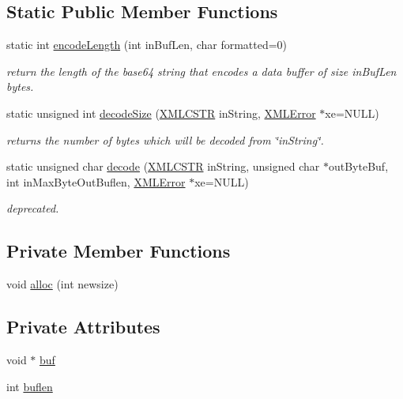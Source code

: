 \subsection*{Static Public Member Functions}
\begin{DoxyCompactItemize}
\item 
static int \hyperlink{structXMLParserBase64Tool_a5fe50fd66dc68efe6f3d39b5eb67fe8d}{encode\-Length} (int in\-Buf\-Len, char formatted=0)
\begin{DoxyCompactList}\small\item\em return the length of the base64 string that encodes a data buffer of size in\-Buf\-Len bytes. \end{DoxyCompactList}\item 
static unsigned int \hyperlink{structXMLParserBase64Tool_adce9ee3c0bc1cae2ab2b511add3ea91e}{decode\-Size} (\hyperlink{xmlParser_8h_acdb0d6fd8dd596384b438d86cfb2b182}{X\-M\-L\-C\-S\-T\-R} in\-String, \hyperlink{xmlParser_8h_ac39bd07b1461aaa70afffe2d7162b4f5}{X\-M\-L\-Error} $\ast$xe=N\-U\-L\-L)
\begin{DoxyCompactList}\small\item\em returns the number of bytes which will be decoded from \char`\"{}in\-String\char`\"{}. \end{DoxyCompactList}\item 
static unsigned char \hyperlink{structXMLParserBase64Tool_af76fe76cb08f0a3fca6d7352c0dcb218}{decode} (\hyperlink{xmlParser_8h_acdb0d6fd8dd596384b438d86cfb2b182}{X\-M\-L\-C\-S\-T\-R} in\-String, unsigned char $\ast$out\-Byte\-Buf, int in\-Max\-Byte\-Out\-Buflen, \hyperlink{xmlParser_8h_ac39bd07b1461aaa70afffe2d7162b4f5}{X\-M\-L\-Error} $\ast$xe=N\-U\-L\-L)
\begin{DoxyCompactList}\small\item\em deprecated. \end{DoxyCompactList}\end{DoxyCompactItemize}
\subsection*{Private Member Functions}
\begin{DoxyCompactItemize}
\item 
void \hyperlink{structXMLParserBase64Tool_a73db2e808f9ebe44eb9d8486453117ee}{alloc} (int newsize)
\end{DoxyCompactItemize}
\subsection*{Private Attributes}
\begin{DoxyCompactItemize}
\item 
void $\ast$ \hyperlink{structXMLParserBase64Tool_ad20588e28651b5c7b2d92baf284ea237}{buf}
\item 
int \hyperlink{structXMLParserBase64Tool_aa86710e29c87e2d78d6f4eacf74b854d}{buflen}
\end{DoxyCompactItemize}



